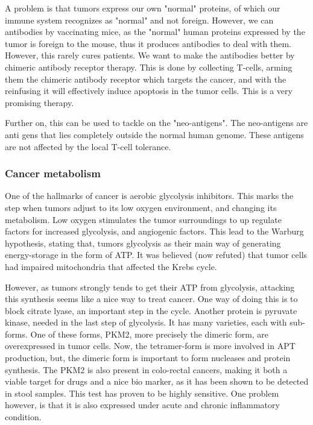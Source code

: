 \documentclass[12p]{article}
\begin{document}
A problem is that tumors express our own "normal" proteins, of which our immune system recognizes as "normal" and not foreign.
However, we can antibodies by vaccinating mice, as the "normal" human proteins expressed by the tumor is foreign to the mouse, thus it produces antibodies to deal with them.
However, this rarely cures patients.
We want to make the antibodies better by chimeric antibody receptor therapy.
This is done by collecting T-cells, arming them the chimeric antibody receptor which targets the cancer, and with the reinfusing it will effectively induce apoptosis in the tumor cells.
This is a very promising therapy.

Further on, this can be used to tackle on the "neo-antigens".
The neo-antigens are anti gens that lies completely outside the normal human genome.
These antigens are not affected by the local T-cell tolerance.

\subsubsection*{Cancer metabolism}

One of the hallmarks of cancer is aerobic glycolysis inhibitors.
This marks the step when tumors adjust to its low oxygen environment, and changing its metabolism.
Low oxygen stimulates the tumor surroundings to up regulate factors for increased glycolysis, and angiogenic factors.
This lead to the Warburg hypothesis, stating that, tumors glycolysis as their main way of generating energy-storage in the form of ATP.
It was believed (now refuted) that tumor cells had impaired mitochondria that affected the Krebs cycle.

However, as tumors strongly tends to get their ATP from glycolysis, attacking this synthesis seems like a nice way to treat cancer.
One way of doing this is to block citrate lyase, an important step in the cycle.
Another protein is pyruvate kinase, needed in the last step of glycolysis.
It has many varieties, each with sub-forms.
One of these forms, PKM2, more precisely the dimeric form, are overexpressed in tumor cells.
Now, the tetramer-form is more involved in APT production, but, the dimeric form is important to form nucleases and protein synthesis.
The PKM2 is also present in colo-rectal cancers, making it both a viable target for drugs and a nice bio marker, as it has been shown to be detected in stool samples.
This test has proven to be highly sensitive.
One problem however, is that it is also expressed under acute and chronic inflammatory condition.
\end{document}

